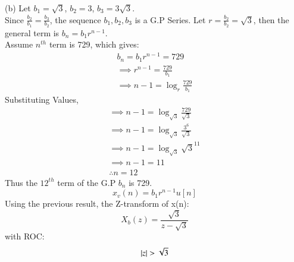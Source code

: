 \documentclass[journal,12pt,twocolumn]{IEEEtran}
\theoremstyle{remark}
\begin{document}
(b) Let $b_1 = \sqrt{3}$, $b_2 = 3$, $b_3 = 3\sqrt{3}$.\\
Since $\frac{b_2}{b_1} = \frac{b_3}{b_2}$, the sequence $b_1, b_2, b_3$ is a G.P Series.
Let $r = \frac{b_2}{b_2} = \sqrt{3}$, then the general term is $b_n = b_1 r^{n-1}$.\\
Assume $n^{th}$ term is 729, which gives: 
\begin{gather*}
    b_n = b_1 r^{n-1} = 729\\
    \implies r^{n-1} = \frac{729}{b_1}\\
    \implies n - 1 = \log_{r}{\frac{729}{b_1}}
\end{gather*}
Substituting Values,
\begin{gather*}
    \implies n - 1 = \log_{\sqrt{3}}{\frac{729}{\sqrt{3}}}\\
    \implies n - 1 = \log_{\sqrt{3}}{\frac{3^6}{\sqrt{3}}}\\
    \implies n - 1 = \log_{\sqrt{3}}{\sqrt{3}^{11}}\\
    \implies n - 1 = 11\\
    \therefore n = 12
\end{gather*}
Thus the $12^{th}$ term of the G.P $b_n$ is 729.
\[ x_v(n) = b_1r^{n - 1}u[n] \]
Using the previous result, the Z-transform of x(n):
\[X_b(z) = \frac{\sqrt{3}}{z - \sqrt{3}}\]
with ROC: \[ \left\vert z\right\vert > \sqrt{3} \]
\end{document}
